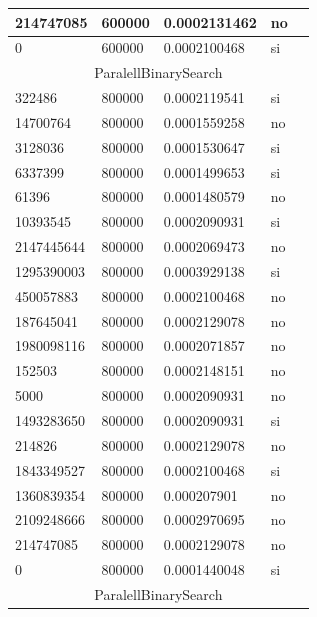 \documentclass[12pt, fleqn]{article}                             %
\theoremstyle{break}                                            %
\begin{document}
\begin{longtable}{|m{5em}|m{5em}|m{10em}|m{5em}|@{}m{0pt}@{}}
            214747085& 600000  & 0.0002131462 & no &\\[1em]    \hline
            0& 600000  & 0.0002100468 & si &\\[1em]    \hline
            \multicolumn{5}{|c|}{ParalellBinarySearch}   \\          \hline
            322486& 800000  & 0.0002119541 & si &\\[1em]    \hline
            14700764& 800000  & 0.0001559258 & no &\\[1em]    \hline
            3128036& 800000  & 0.0001530647 & si &\\[1em]    \hline
            6337399& 800000  & 0.0001499653 & si &\\[1em]    \hline
            61396& 800000  & 0.0001480579 & no &\\[1em]    \hline
            10393545& 800000  & 0.0002090931 & si &\\[1em]    \hline
            2147445644& 800000  & 0.0002069473 & no &\\[1em]    \hline
            1295390003& 800000  & 0.0003929138 & si &\\[1em]    \hline
            450057883& 800000  & 0.0002100468 & no &\\[1em]    \hline
            187645041& 800000  & 0.0002129078 & no &\\[1em]    \hline
            1980098116& 800000  & 0.0002071857 & no &\\[1em]    \hline
            152503& 800000  & 0.0002148151 & no &\\[1em]    \hline
            5000& 800000  & 0.0002090931 & no &\\[1em]    \hline
            1493283650& 800000  & 0.0002090931 & si &\\[1em]    \hline
            214826& 800000  & 0.0002129078 & no &\\[1em]    \hline
            1843349527& 800000  & 0.0002100468 & si &\\[1em]    \hline
            1360839354& 800000  & 0.000207901 & no &\\[1em]    \hline
            2109248666& 800000  & 0.0002970695 & no &\\[1em]    \hline
            214747085& 800000  & 0.0002129078 & no &\\[1em]    \hline
            0& 800000  & 0.0001440048 & si &\\[1em]    \hline
            \multicolumn{5}{|c|}{ParalellBinarySearch}   \\          \hline

\end{longtable}
\end{document}
